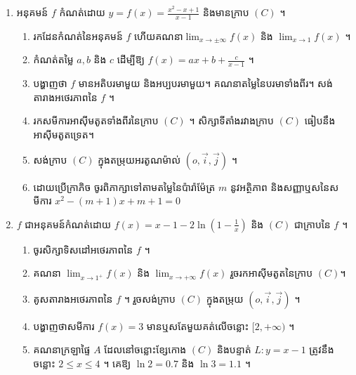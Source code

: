 \documentclass[a4paper,11pt]{article}
\begin{document}
\begin{enumerate}[I]
\begin{enumerate}[1]
\end{enumerate}
\item អនុគមន៍ $f$ កំណត់ដោយ $y=f(x)=\frac{x^2-x+1}{x-1}$ និងមានក្រាប $(C)$ ។
\begin{enumerate}[1]
\item រកដែនកំណត់នៃអនុគមន៍ $f$ ហើយគណនា$\lim_{x\to\pm \infty }f(x)$ និង $\lim_{x\to 1}f(x)$ ។ 
\item កំណត់តម្លៃ $a,b$ និង $c$ ដើម្បីឱ្យ $f(x)=ax+b+\frac{c}{x-1}$ ។
\item បង្ហាញថា $f$ មានអតិបរមាមួយ និងអប្បបរមាមួយ។ គណនាតម្លៃនៃបរមាទាំងពីរ។ សង់តារាងអថេរភាពនៃ $f$ ។
\item រកសមីការអាស៊ីមតូតទាំងពីរនៃក្រាប $(C)$ ។ សិក្សាទីតាំងរវាងក្រាប $(C)$ ធៀបនឹងអាស៊ីមតូតទ្រេត។
\item សង់ក្រាប $(C)$ ក្នុងតម្រុយអរតូណម៉ាល់ $(o,\vec{i},\vec{j})$ ។
\item ដោយប្រើក្រាភិច ចូរពិភាក្សាទៅតាមតម្លៃនៃប៉ារ៉ាម៉ែត្រ $m$ នូវអត្ថិភាព និងសញ្ញាឬសនៃសមីការ $x^2-(m+1)x+m+1=0$
\end{enumerate}

\item $f$ ជាអនុគមន៍កំណត់ដោយ $f(x)=x-1-2\ln\left(1-\frac{1}{x}\right)$ និង $(C)$ ជាក្រាបនៃ $f$ ។
\begin{enumerate}[1]
\item ចូរសិក្សាទិសដៅអថេរភាពនៃ $f$ ។
\item គណនា $\lim_{x\to 1^+}{f(x)}$ និង $\lim_{x\to +\infty}{f(x)}$ រួចរកអាស៊ីមតូតនៃក្រាប $(C)$។
\item គូសតារាងអថេរភាពនៃ $f$ ។ រួចសង់ក្រាប $(C)$ ក្នុងតម្រុយ $(o,\vec{i},\vec{j})$ ។
\item បង្ហាញថាសមីការ $f(x)=3$ មានឬសតែមួយគត់លើចន្លោះ $[2,+\infty)$ ។
\item គណនាក្រឡាផ្ទៃ $A$ ដែលនៅចន្លោះខ្សែកោង $(C)$ និងបន្ទាត់ $L: y=x-1$ ត្រូវនឹងចន្លោះ $2\leq x \leq 4$ ។ គេឱ្យ $\ln 2=0.7$ និង $\ln 3=1.1$ ។
\end{enumerate}
\end{enumerate}
\end{document}
